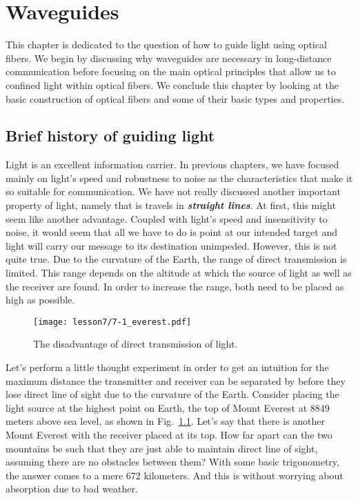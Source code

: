 \chapter{Waveguides}
\label{sec:7_waveguides}

This chapter is dedicated to the question of how to guide light using optical fibers.
We begin by discussing why waveguides are necessary in long-distance communication before focusing on the main optical principles that allow us to confined light within optical fibers.
We conclude this chapter by looking at the basic construction of optical fibers and some of their basic types and properties.

\section{Brief history of guiding light}
\label{sec:7-1_history}

Light is an excellent information carrier.
In previous chapters, we have focused mainly on light's speed and robustness to noise as the characteristics that make it so suitable for communication.
We have not really discussed another important property of light, namely that is travels in \emph{\textbf{straight lines}}.
At first, this might seem like another advantage.
Coupled with light's speed and insensitivity to noise, it would seem that all we have to do is point at our intended target and light will carry our message to its destination unimpeded.
However, this is not quite true.
Due to the curvature of the Earth, the range of direct transmission is limited.
This range depends on the altitude at which the source of light as well as the receiver are found.
In order to increase the range, both need to be placed as high as possible.

\begin{figure}[H]
    \centering
    \texttt{[image: lesson7/7-1\_everest.pdf]}
    \caption[Two Everests]{The disadvantage of direct transmission of light.}
    \label{fig:7-1_everest}
\end{figure}

Let's perform a little thought experiment in order to get an intuition for the maximum distance the transmitter and receiver can be separated by before they lose direct line of sight due to the curvature of the Earth.
Consider placing the light source at the highest point on Earth, the top of Mount Everest at 8849 meters above sea level, as shown in Fig.~\ref{fig:7-1_everest}.
Let's say that there is another Mount Everest with the receiver placed at its top.
How far apart can the two mountains be such that they are just able to maintain direct line of sight, assuming there are no obstacles between them?
With some basic trigonometry, the answer comes to a mere 672 kilometers.
And this is without worrying about absorption due to bad weather.

